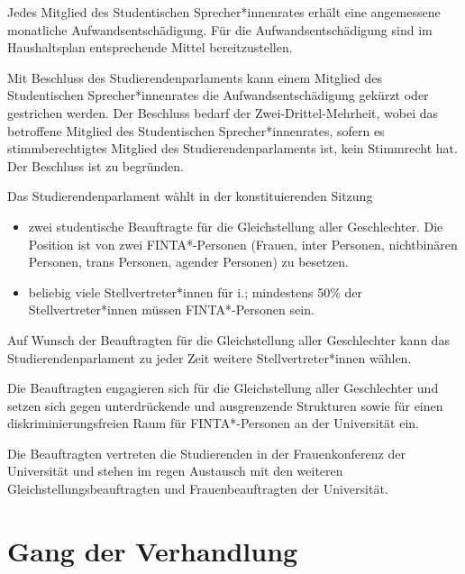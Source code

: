 \documentclass[10pt,a4paper]{scrartcl}
\begin{document}
\begin{contract}
\label{aufwandsentschaedigungen-ssr}

Jedes Mitglied des Studentischen Sprecher*innenrates erhält eine angemessene
monatliche Aufwandsentschädigung. Für die Aufwandsentschädigung sind im
Haushaltsplan entsprechende Mittel bereitzustellen.

Mit Beschluss des Studierendenparlaments kann einem Mitglied des
Studentischen Sprecher*innenrates die Aufwandsentschädigung gekürzt oder
gestrichen werden. Der Beschluss bedarf der Zwei-Drittel-Mehrheit, wobei das
betroffene Mitglied des Studentischen Sprecher*innenrates, sofern es
stimmberechtigtes Mitglied des Studierendenparlaments ist, kein Stimmrecht hat.
Der Beschluss ist zu begründen.
   
\label{beauftragte-fuer-die-gleichstellung-aller-geschlechter}

Das Studierendenparlament wählt in der konstituierenden Sitzung
\begin{itemize}
	\item zwei studentische Beauftragte für die Gleichstellung aller Geschlechter. Die Position ist von zwei FINTA*-Personen (Frauen, inter Personen, nichtbinären Personen, trans Personen, agender Personen) zu besetzen.
	\item beliebig viele Stellvertreter*innen für i.; mindestens 50\% der Stellvertreter*innen müssen FINTA*-Personen sein.
\end{itemize}

Auf Wunsch der Beauftragten für die Gleichstellung aller Geschlechter kann das Studierendenparlament zu jeder Zeit weitere Stellvertreter*innen wählen.

Die Beauftragten engagieren sich für die Gleichstellung aller Geschlechter und setzen sich gegen unterdrückende und ausgrenzende Strukturen sowie für einen diskriminierungsfreien Raum für FINTA*-Personen an der Universität ein.

Die Beauftragten vertreten die Studierenden in der Frauenkonferenz der Universität und stehen im regen Austausch mit den weiteren Gleichstellungsbeauftragten und Frauenbeauftragten der Universität.

\end{contract}


\section{Gang der Verhandlung}\label{gang-der-verhandlung}
\end{document}
